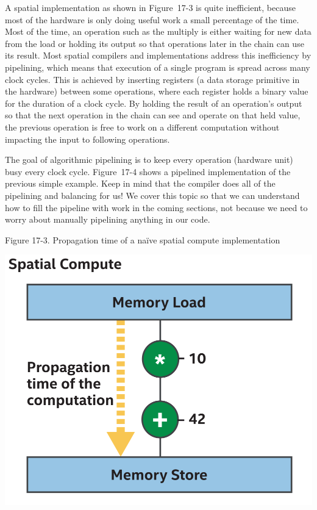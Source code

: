 A spatial implementation as shown in Figure 17-3 is quite inefficient, because most of the hardware is only doing useful work a small percentage of the time. Most of the time, an operation such as the multiply is either waiting for new data from the load or holding its output so that operations later in the chain can use its result. Most spatial compilers and implementations address this inefficiency by pipelining, which means that execution of a single program is spread across many clock cycles. This is achieved by inserting registers (a data storage primitive in the hardware) between some operations, where each register holds a binary value for the duration of a clock cycle. By holding the result of an operation’s output so that the next operation in the chain can see and operate on that held value, the previous operation is free to work on a different computation without impacting the input to following operations.\par

The goal of algorithmic pipelining is to keep every operation (hardware unit) busy every clock cycle. Figure 17-4 shows a pipelined implementation of the previous simple example. Keep in mind that the compiler does all of the pipelining and balancing for us! We cover this topic so that we can understand how to fill the pipeline with work in the coming sections, not because we need to worry about manually pipelining anything in our code.\par

\hspace*{\fill} \par %
Figure 17-3. Propagation time of a naïve spatial compute 
implementation
\begin{center}
	\includegraphics[width=1.0\textwidth]{content/chapter-17/images/4}
\end{center}

